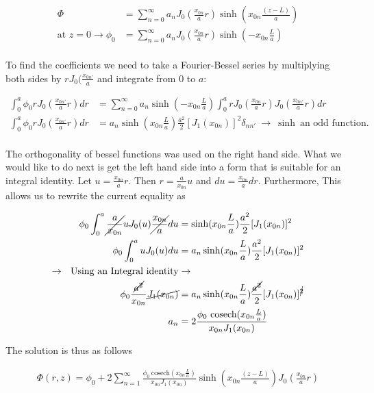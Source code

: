\documentclass[paper=a4, fontsize=11pt]{scrartcl} %
\numberwithin{equation}{section} %
\numberwithin{figure}{section} %
\numberwithin{table}{section} %
\begin{document}
\begin{align}
\Phi &= \sum_{n=0}^{\infty} a_n J_0(\frac{x_{0n}}{a}r)\sinh(x_{0n}\frac{(z-L)}{a}) \\ 
\text{at $z=0$} \rightarrow \phi_0 &=  \sum_{n=0}^{\infty}a_nJ_0(\frac{x_{0n}}{a}r)\sinh(-x_{0n}\frac{L}{a})\\
\end{align}

To find the coefficients we need to take a Fourier-Bessel series by multiplying both sides by $rJ_0(\frac{x_{0n'}}{a}$ and integrate from $0$ to $a$:

\begin{align}
\int_0^a \phi_0 rJ_0\left(\frac{x_{0n'}}{a}r\right)dr &= \sum_{n=0}^{\infty}a_n \sinh(-x_{0n}\frac{L}{a}) \int_0^a r J_0\left(\frac{x_{0n}}{a}r\right) J_0\left(\frac{x_{0n'}}{a}r\right)dr \\
\int_0^a \phi_0 rJ_0\left(\frac{x_{0n'}}{a}r\right)dr &= a_n\sinh(x_{0n}\frac{L}{a}) \frac{a^2}{2}[J_1(x_{0n})]^2\delta_{nn'} \ \rightarrow \ \sinh \ \text{an odd function.} \\ 
\end{align}

The orthogonality of bessel functions was used on the right hand side. What we would like to do next is get the left hand side into a form that is suitable for an integral identity. Let $u = \frac{x_{0n}}{a}r$. Then $r = \frac{a}{x_{0n}}u$ and  $du = \frac{x_{0n}}{a}dr$. Furthermore, This allows us to rewrite the current equality as  

\begin{align}
\phi_0\int_0^a \cancel{\frac{a}{x_{0n}}}uJ_0(u)\cancel{\frac{x_{0n}}{a}}du &= \sinh(x_{0n}\frac{L}{a}) \frac{a^2}{2}[J_1(x_{0n})]^2 \\
\phi_0\int_0^a uJ_0(u)du &= a_n\sinh(x_{0n}\frac{L}{a}) \frac{a^2}{2}[J_1(x_{0n})]^2 \\
\rightarrow \  \ \text{Using an Integral identity}& \rightarrow \\
\phi_0\frac{\cancel{a^2}}{x_{0n}}\cancel{J_1(x_{0n})} &= a_n\sinh(x_{0n}\frac{L}{a}) \frac{\cancel{a^2}}{2}[J_1(x_{0n})]^{\cancel{2}}\\
a_n &= 2\frac{\phi_0 \ \text{cosech}(x_{0n}\frac{L}{a})}{x_{0n}J_1(x_{0n})}
\end{align}

The solution is thus as follows

\begin{align}
\Phi(r,z) = \phi_0 + 2\sum_{n=1}^{\infty}\frac{\phi_0 \ \text{cosech}(x_{0n}\frac{L}{a})}{x_{0n}J_1(x_{0n})}\sinh(x_{0n}\frac{(z-L)}{a})J_0\left(\frac{x_{0n}}{a}r\right)
\end{align}
\end{document}
